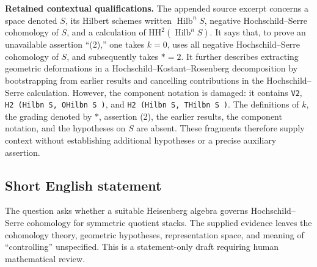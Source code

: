 \documentclass[11pt]{article}
\begin{document}
\textbf{Retained contextual qualifications.} The appended source excerpt concerns a space denoted \(S\), its Hilbert schemes written \(\operatorname{Hilb}^n S\), negative Hochschild--Serre cohomology of \(S\), and a calculation of \(\mathrm{HH}^{2}(\operatorname{Hilb}^n S)\). It says that, to prove an unavailable assertion ``(2),'' one takes \(k=0\), uses all negative Hochschild--Serre cohomology of \(S\), and subsequently takes \(\ast=2\). It further describes extracting geometric deformations in a Hochschild--Kostant--Rosenberg decomposition by bootstrapping from earlier results and cancelling contributions in the Hochschild--Serre calculation. However, the component notation is damaged: it contains \texttt{V2}, \texttt{H2 (Hilbn S, OHilbn S )}, and \texttt{H2 (Hilbn S, THilbn S )}. The definitions of \(k\), the grading denoted by \(\ast\), assertion (2), the earlier results, the component notation, and the hypotheses on \(S\) are absent. These fragments therefore supply context without establishing additional hypotheses or a precise auxiliary assertion.
\subsection{Short English statement}
The question asks whether a suitable Heisenberg algebra governs Hochschild--Serre cohomology for symmetric quotient stacks. The supplied evidence leaves the cohomology theory, geometric hypotheses, representation space, and meaning of ``controlling'' unspecified. This is a statement-only draft requiring human mathematical review.
\end{document}
